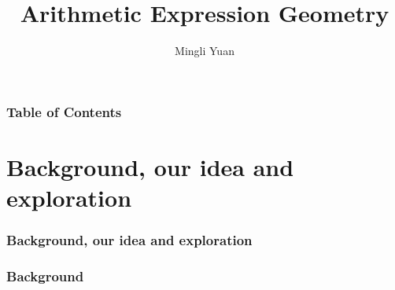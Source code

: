 \documentclass[aspectratio=169]{beamer}
\title{Arithmetic Expression Geometry}
\author[Author] {Mingli Yuan}
\begin{document}
\pgfplotsset{compat=1.18}

\begin{frame}
\maketitle
\end{frame}

\begin{frame}
\frametitle{Table of Contents}
\tableofcontents
\end{frame}

\section{Background, our idea and exploration}

\begin{frame}
    \frametitle{Background, our idea and exploration}
    \begin{figure}[ht]\centering
    \end{figure}
\end{frame}

\begin{frame}
    \frametitle{Background}
    \begin{figure}[ht]\centering
    \end{figure}
\end{frame}
\end{document}
